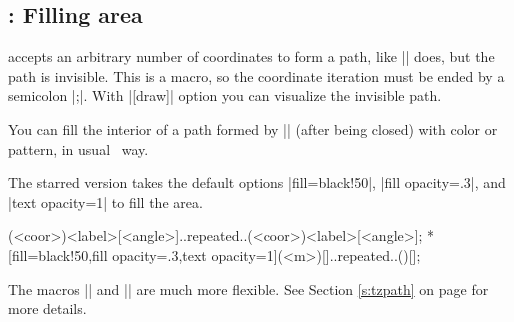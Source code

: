 \subsection{\protect\cmd{\tzpath*}: Filling area}
\label{ssi:tzpath}

\icmd{\tzpath} accepts an arbitrary number of coordinates to form a path, like |\tzlines| does, but the path is invisible. This is a  macro, so the coordinate iteration must be ended by a semicolon |;|.
With |[draw]| option you can visualize the invisible path.

\begin{tzcode}{.3}
\end{tzcode}

You can fill the interior of a path formed by |\tzpath| (after being closed) with color or pattern, in usual \Tikz\ way.

\begin{tzcode}{.3}
\end{tzcode}

\begin{tzcode}{.3}
\end{tzcode}



The starred version \icmd{\tzpath*} takes the default options |fill=black!50|, |fill opacity=.3|, and |text opacity=1| to fill the area.

\begin{tzdef}
\tzpath*[<opt>](<coor>){<label>}[<angle>]..repeated..(<coor>){<label>}[<angle>];
 *[fill=black!50,fill opacity=.3,text opacity=1](<m>){}[]..repeated..(){}[];
\end{tzdef}

The macros |\tzpath| and |\tzpath*| are much more flexible. See Section \ref{s:tzpath} on page \pageref{s:tzpath} for more details.


